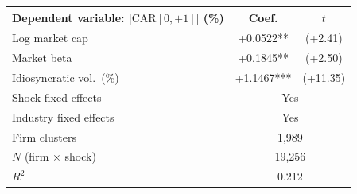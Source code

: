 \begin{tabular}{lcc}
\toprule
Dependent variable: $|\text{CAR}[0,+1]|$ (\%) & Coef. & $t$ \\
\midrule
Log market cap & +0.0522** & (+2.41) \\
Market beta & +0.1845** & (+2.50) \\
Idiosyncratic vol.\ (\%) & +1.1467*** & (+11.35) \\
\midrule Shock fixed effects & \multicolumn{2}{c}{Yes} \\
Industry fixed effects & \multicolumn{2}{c}{Yes} \\
Firm clusters & \multicolumn{2}{c}{1,989} \\
$N$ (firm $\times$ shock) & \multicolumn{2}{c}{19,256} \\
$R^2$ & \multicolumn{2}{c}{0.212} \\
\bottomrule
\end{tabular}
